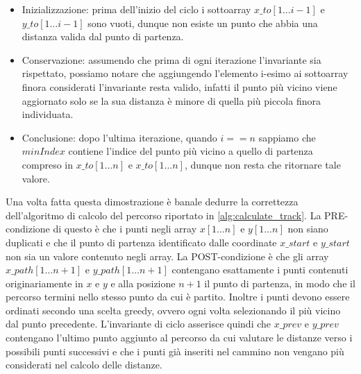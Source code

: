 \begin{itemize}
    \item Inizializzazione: prima dell'inizio del ciclo i sottoarray $x\_to[1 \dotso i-1]$ e $y\_to[1 \dotso i-1]$ sono vuoti, dunque non esiste un punto che abbia una distanza valida dal punto di partenza.
    \item Conservazione: assumendo che prima di ogni iterazione l'invariante sia rispettato, possiamo notare che aggiungendo l'elemento i-esimo ai sottoarray finora considerati l'invariante resta valido, infatti il punto più vicino viene aggiornato solo se la sua distanza è minore di quella più piccola finora individuata.
    \item Conclusione: dopo l'ultima iterazione, quando $i == n$ sappiamo che $minIndex$ contiene l'indice del punto più vicino a quello di partenza compreso in $x\_to[1 \dotso n]$ e $x\_to[1 \dotso n]$, dunque non resta che ritornare tale valore.
\end{itemize}

Una volta fatta questa dimostrazione è banale dedurre la correttezza dell'algoritmo di calcolo del percorso riportato in \ref{alg:calculate_track}. La PRE-condizione di questo è che i punti negli array $x[1 \dotso n]$ e $y[1 \dotso n]$ non siano duplicati e che il punto di partenza identificato dalle coordinate $x\_start$ e $y\_start$ non sia un valore contenuto negli array. La POST-condizione è che gli array $x\_path[1 \dotso n+1]$ e $y\_path[1 \dotso n+1]$ contengano esattamente i punti contenuti originariamente in $x$ e $y$ e alla posizione $n+1$ il punto di partenza, in modo che il percorso termini nello stesso punto da cui è partito. Inoltre i punti devono essere ordinati secondo una scelta greedy, ovvero ogni volta selezionando il più vicino dal punto precedente. L'invariante di ciclo asserisce quindi che $x\_prev$ e $y\_prev$ contengano l'ultimo punto aggiunto al percorso da cui valutare le distanze verso i possibili punti successivi e che i punti già inseriti nel cammino non vengano più considerati nel calcolo delle distanze.


